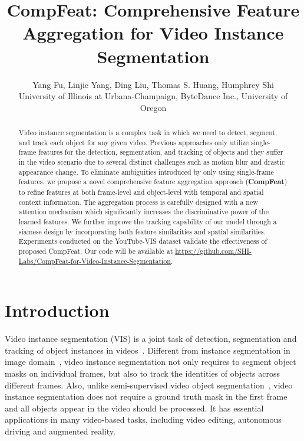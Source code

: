 \documentclass[letterpaper]{article} \usepackage{aaai21}  \usepackage{times}  \usepackage{helvet} \usepackage{courier}  \usepackage[hyphens]{url}  \usepackage{graphicx} \urlstyle{rm} \def\UrlFont{\rm}  \usepackage{natbib}  \usepackage{caption} \frenchspacing  \setlength{\pdfpagewidth}{8.5in}  \setlength{\pdfpageheight}{11in}  \newcommand{\etal}{\emph{et al. }}
\title{CompFeat: Comprehensive Feature Aggregation for Video Instance Segmentation}
\author{Yang Fu,  Linjie Yang, Ding Liu, Thomas S. Huang, Humphrey Shi \\ 
{\small University of Illinois at Urbana-Champaign},
{\small ByteDance Inc.}, {\small University of Oregon}\\ }
\begin{document}
\maketitle
\begin{abstract}
Video instance segmentation is a complex task in which we need to detect, segment, and track each object for any given video. Previous approaches only utilize single-frame features for the detection, segmentation, and tracking of objects and they suffer in the video scenario due to several distinct challenges such as motion blur and drastic appearance change. 
To eliminate ambiguities introduced by only using single-frame features, we propose a novel comprehensive feature aggregation approach (\textbf{CompFeat}) to refine features at both frame-level and object-level with temporal and spatial context information. 
The aggregation process is carefully designed with a new attention mechanism which significantly increases the discriminative power of the learned features.
We further improve the tracking capability of our model through a siamese design by incorporating both feature similarities and spatial similarities. Experiments conducted on the YouTube-VIS dataset validate the effectiveness of proposed CompFeat.
Our code will be available at \url{https://github.com/SHI-Labs/CompFeat-for-Video-Instance-Segmentation}.

 \end{abstract}

\section{Introduction}
Video instance segmentation (VIS) is a joint task of detection, segmentation and tracking of object instances in videos~\cite{yang2019video}. Different from instance segmentation in image domain~\cite{hariharan2014simultaneous}, video instance segmentation not only requires to segment object masks on individual frames, but also to track the identities of objects across different frames. Also, unlike semi-supervised video object segmentation~\cite{voigtlaender2019feelvos, voigtlaender2017online, xu2018youtube, wug2018fast, oh2019video, xu2019spatiotemporal}, video instance segmentation does not require a ground truth mask in the first frame and all objects appear in the video should be processed. It has essential applications in many video-based tasks, including video editing, autonomous driving and augmented reality.
\end{document}
